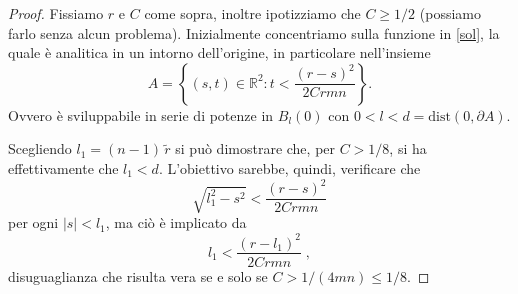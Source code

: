 \begin{proof}
Fissiamo $r$ e $C$ come sopra, inoltre ipotizziamo che $C\geq 1/2$ (possiamo farlo senza alcun problema). 
Inizialmente concentriamo sulla funzione in \eqref{sol}, la quale è analitica in un intorno dell'origine, in particolare nell'insieme 
$$A = \left\{ (s,t) \in \mathbb{R}^2 : t<\frac{(r-s)^2}{2Crmn} \right\} .$$
Ovvero è sviluppabile in serie di potenze in $B_l(0)$ con $0<l<d=\text{dist}(0, \partial A)$.
\begin{center}
\end{center}
Scegliendo $l_1 = (n-1)\,\widetilde{r}$ si può dimostrare che, per $C>1/8$, si ha effettivamente che $l_1<d$. L'obiettivo sarebbe, quindi, verificare che $$\sqrt{l_1^2-s^2} < \frac{(r-s)^2}{2Crmn}$$ per ogni $|s|<l_1$, ma ciò è implicato da 
\begin{equation} \label{l1}
l_1 < \frac{(r-l_1)^2}{2Crmn}\; ,
\end{equation}
disuguaglianza che risulta vera se e solo se $C > 1/(4mn) \leq 1/8$.


\end{proof}
